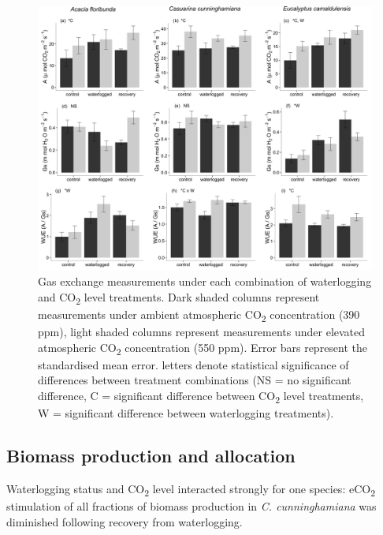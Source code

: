\documentclass[12pt,a4paper]{memoir}
\begin{document}
\begin{figure}[ht]
\begin{center}
\includegraphics[width=\linewidth,keepaspectratio=true]{Ch5gasexchange2.png} %
\caption[Gas exchange measurements under each combination of waterlogging and CO\textsubscript{2} level treatments.]{\small{Gas exchange measurements under each combination of waterlogging and CO\textsubscript{2} level treatments. Dark shaded columns represent measurements under ambient atmospheric CO\textsubscript{2} concentration (390 ppm), light shaded columns represent measurements under elevated atmospheric CO\textsubscript{2} concentration (550 ppm). Error bars represent the standardised mean error. \newline* letters denote statistical significance of differences between treatment combinations (NS = no significant difference, C = significant difference between CO\textsubscript{2} level treatments, W = significant difference between waterlogging treatments).}} %
\label{fig:Ch5_F1} %
\end{center}
\end{figure}

\subsection{Biomass production and allocation}
Waterlogging status and CO\textsubscript{2} level interacted strongly for one species: eCO\textsubscript{2} stimulation of all fractions of biomass production in \textit{C. cunninghamiana} was diminished following recovery from waterlogging. 
\end{document}
